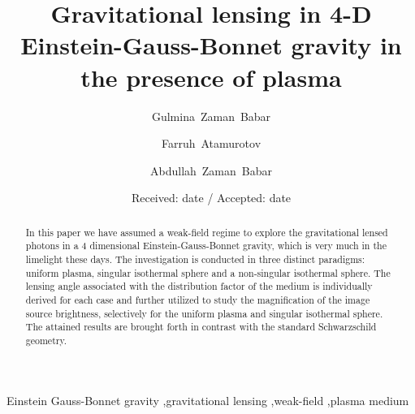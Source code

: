 \documentclass[final,5p,times,twocolumn,unknownkeysallowed]{elsarticle}
\begin{document}
\begin{frontmatter}



\title{Gravitational lensing in 4-D Einstein-Gauss-Bonnet gravity in the presence of plasma}%

\author[mainaddress1]
{Gulmina~Zaman~Babar}
%
\author[mainaddress2,mainaddress3,mainaddress4]
{Farruh~Atamurotov}
%
\author[mainaddress5]
{Abdullah~Zaman~Babar}


\address[mainaddress1]{School of Natural Sciences, National University of Sciences and Technology, Sector H-12, Islamabad, Pakistan}
\address[mainaddress2]{Inha University in Tashkent, Ziyolilar 9, Tashkent, 100170, Uzbekistan}
\address[mainaddress3]{Akfa University, Kichik Halqa Yuli Street 17,  Tashkent 100095, Uzbekistan}
\address[mainaddress4]{Ulugh Beg Astronomical Institute, Astronomy St. 33, Tashkent 100052, Uzbekistan}
\address[mainaddress5]{Department of Electrical Engineering, Air University, Islamabad, Pakistan}



\date{Received: date / Accepted: date}




\begin{abstract}
In this paper we have assumed a weak-field regime to explore the gravitational lensed photons
in a 4 dimensional Einstein-Gauss-Bonnet gravity, which is very much in the limelight these days. The investigation is conducted
in three distinct paradigms: uniform plasma, singular isothermal sphere and a non-singular isothermal sphere.
The lensing angle associated with the distribution factor of the medium is individually derived for each case and further
utilized to study the magnification of the image source brightness, selectively for the uniform plasma and singular isothermal sphere.
The attained results are brought forth in contrast with the standard Schwarzschild geometry.
\end{abstract}

\begin{keyword}
Einstein Gauss-Bonnet gravity \sep gravitational lensing \sep weak-field \sep plasma medium
\end{keyword}

\end{frontmatter}
\end{document}
